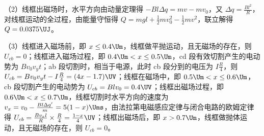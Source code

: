 \documentclass[\gkver]{gaokaozhenti}
\begin{document}
\begin{enumerate}
{	（2）线框出磁场时，水平方向由动量定理得 $-Bl\Delta q=mv-mv_{0}$，又 $\Delta q=\frac{Bl^{2}}{R}$，对线框运动的全过程，由能量守恒得 $Q=mgl+\frac{1}{2}mv_{0}^{2}-\frac{1}{2}mv^{2}$，联立解得 $Q=0.0375\UJ$。

	（3）线框进入磁场前，即 $x\leq0.4\Um$，线框做平抛运动，且无磁场的存在，则 $U_{cb}=0$；线框进入磁场过程，即 $0.4\Um<x\leq0.5\Um$，cd 段有效切割产生的电动势为 $Bv_{0}v_{y}t$；ab 段切割时，相当于电源，此时 cb 段分到的电压为 $I\frac{R}{4}$，则 $U_{cb}=Bv_{0}v_{y}t-I\frac{R}{4}=(4x-1.7)\UV$；线框在磁场中，即 $0.5\Um<x\leq0.6\Um$，cb 段切割产生的电动势为 $U_{cb}=Blv_{0}=0.4\UV$；线框出磁场过程，即 $0.6\Um<x\leq0.7\Um$，线框切割时水平方向的速度为 $v_{x}=v_{0}-\frac{Bl\Delta q'}{m}=5(1-x)\Ums$，由法拉第电磁感应定律与闭合电路的欧姆定律得 $U_{cb}=\frac{Bv_{x}l}{R}\times\frac{R}{4}=\frac{1-x}{4}\UV$；线框出磁场后，即 $x>0.7\Um$，线框做抛体运动，且无磁场的存在，则 $U_{cb}=0$。
}

\end{enumerate}
\end{document}
